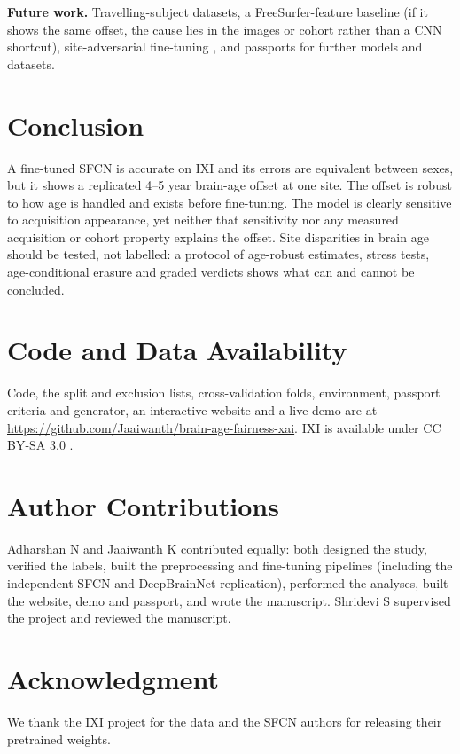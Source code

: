 \documentclass[conference]{IEEEtran}
\begin{document}
\textbf{Future work.} Travelling-subject datasets, a FreeSurfer-feature baseline (if it shows the same offset, the cause lies in the images or cohort rather than a CNN shortcut), site-adversarial fine-tuning \cite{dinsdale2021unlearning}, and passports for further models and datasets.

\section{Conclusion}
A fine-tuned SFCN is accurate on IXI and its errors are equivalent between sexes, but it shows a replicated 4--5 year brain-age offset at one site. The offset is robust to how age is handled and exists before fine-tuning. The model is clearly sensitive to acquisition appearance, yet neither that sensitivity nor any measured acquisition or cohort property explains the offset. Site disparities in brain age should be tested, not labelled: a protocol of age-robust estimates, stress tests, age-conditional erasure and graded verdicts shows what can and cannot be concluded.

\section*{Code and Data Availability}
Code, the split and exclusion lists, cross-validation folds, environment, passport criteria and generator, an interactive website and a live demo are at \url{https://github.com/Jaaiwanth/brain-age-fairness-xai}. IXI is available under CC BY-SA 3.0 \cite{ixi}.

\section*{Author Contributions}
Adharshan N and Jaaiwanth K contributed equally: both designed the study, verified the labels, built the preprocessing and fine-tuning pipelines (including the independent SFCN and DeepBrainNet replication), performed the analyses, built the website, demo and passport, and wrote the manuscript. Shridevi S supervised the project and reviewed the manuscript.

\section*{Acknowledgment}
We thank the IXI project for the data and the SFCN authors for releasing their pretrained weights.



\end{document}
